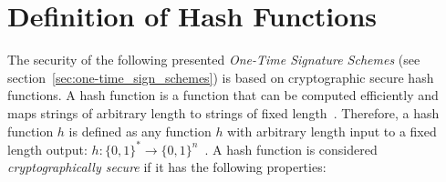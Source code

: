

\section{Definition of Hash Functions} 
\label{sec:def_hashfunctions}
The security of the following presented \textit{One-Time Signature Schemes} (see section~\ref{sec:one-time_sign_schemes}) %
is based on cryptographic secure hash functions. A hash function is a function that can be computed efficiently and maps strings of arbitrary length to strings of fixed length~\cite{cha:bg_hashfunctions_thesis_matusiewicz2007}. Therefore, a hash function $h$ is defined as any function $h$ with arbitrary length input to a fixed length output: $h: \{0,1\}^* \rightarrow \{0,1\}^n$~\cite{cha:bg_hashfunctoins_Stinson2006}. A hash function is considered \textit{cryptographically secure} if it has the following  properties:~\cite{cha:bg_hashfunctions_BASIC_DEFINITIONS_Springer2004} 

